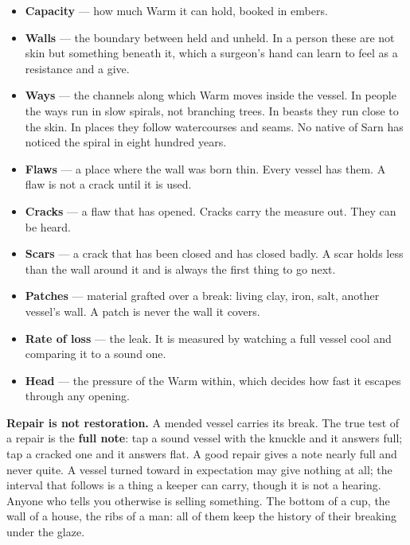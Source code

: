 \documentclass{design/chronicle}
\begin{document}
\begin{itemize}[leftmargin=1.4em,itemsep=1pt,topsep=3pt,parsep=0pt]

\item \textbf{Capacity} — how much Warm it can hold, booked in embers.

\item \textbf{Walls} — the boundary between held and unheld. In a person these are not skin but something beneath it, which a surgeon’s hand can learn to feel as a resistance and a give.

\item \textbf{Ways} — the channels along which Warm moves inside the vessel. In people the ways run in slow spirals, not branching trees. In beasts they run close to the skin. In places they follow watercourses and seams. No native of Sarn has noticed the spiral in eight hundred years.

\item \textbf{Flaws} — a place where the wall was born thin. Every vessel has them. A flaw is not a crack until it is used.

\item \textbf{Cracks} — a flaw that has opened. Cracks carry the measure out. They can be heard.

\item \textbf{Scars} — a crack that has been closed and has closed badly. A scar holds less than the wall around it and is always the first thing to go next.

\item \textbf{Patches} — material grafted over a break: living clay, iron, salt, another vessel’s wall. A patch is never the wall it covers.

\item \textbf{Rate of loss} — the leak. It is measured by watching a full vessel cool and comparing it to a sound one.

\item \textbf{Head} — the pressure of the Warm within, which decides how fast it escapes through any opening.

\end{itemize}

\textbf{Repair is not restoration.} A mended vessel carries its break. The true test of a repair is the \textbf{full note}: tap a sound vessel with the knuckle and it answers full; tap a cracked one and it answers flat. A good repair gives a note nearly full and never quite. A vessel turned toward in expectation may give nothing at all; the interval that follows is a thing a keeper can carry, though it is not a hearing. Anyone who tells you otherwise is selling something. The bottom of a cup, the wall of a house, the ribs of a man: all of them keep the history of their breaking under the glaze.
\end{document}
